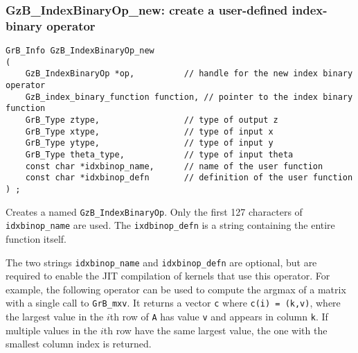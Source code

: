\documentclass[12pt]{article}
\begin{document}
\newpage
\subsubsection{{\sf GzB\_IndexBinaryOp\_new:} create a user-defined index-binary operator}
\label{idxbinop_new_named}

\begin{mdframed}[userdefinedwidth=6in]
{\footnotesize
\begin{verbatim}
GrB_Info GzB_IndexBinaryOp_new
(
    GzB_IndexBinaryOp *op,          // handle for the new index binary operator
    GzB_index_binary_function function, // pointer to the index binary function
    GrB_Type ztype,                 // type of output z
    GrB_Type xtype,                 // type of input x
    GrB_Type ytype,                 // type of input y
    GrB_Type theta_type,            // type of input theta
    const char *idxbinop_name,      // name of the user function
    const char *idxbinop_defn       // definition of the user function
) ;
\end{verbatim} }\end{mdframed}

Creates a named \verb'GzB_IndexBinaryOp'.  Only the first 127 characters of
\verb'idxbinop_name' are used.  The \verb'ixdbinop_defn' is a string containing
the entire function itself.

The two strings \verb'idxbinop_name' and \verb'idxbinop_defn' are optional, but
are required to enable the JIT compilation of kernels that use this operator.
For example, the following operator can be used to compute the argmax of a
matrix with a single call to \verb'GrB_mxv'.  It returns a vector \verb'c'
where \verb'c(i) = (k,v)', where the largest value in the $i$th row of \verb'A'
has value \verb'v' and appears in column \verb'k'.  If multiple values in the
$i$th row have the same largest value, the one with the smallest column index
is returned.
\end{document}
